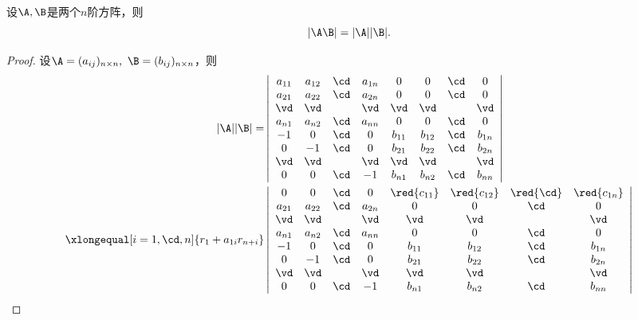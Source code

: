 \begin{dingli}
  设$\A,\B$是两个$n$阶方阵，则
  $$
  |\A\B| = |\A||\B|.
  $$
\end{dingli}
\begin{proof}

  设$\A=(a_{ij})_{n\times n}, ~\B=(b_{ij})_{n\times n}$，则
  $$
  \begin{aligned}
    |\A||\B| =& \left|
      \begin{array}{cccccccc}
        a_{11} & a_{12} & \cd &  a_{1n} & 0 & 0 & \cd & 0\\
        a_{21} & a_{22} & \cd &  a_{2n} & 0 & 0 & \cd & 0\\
        \vd   & \vd   &     & \vd    & \vd & \vd & & \vd\\
        a_{n1} & a_{n2} & \cd &  a_{nn} & 0 & 0 & \cd & 0\\
        -1    & 0     & \cd &   0    & b_{11} & b_{12} & \cd & b_{1n} \\
        0 & -1 & \cd & 0& b_{21} & b_{22} & \cd & b_{2n} \\
        \vd&\vd & & \vd &  \vd  &\vd &  & \vd   \\
        0 & 0 & \cd & -1 & b_{n1} & b_{n2} &\cd     & b_{nn}
      \end{array}
    \right|\\
    \xlongequal[i=1,\cd,n]{r_1+a_{1i}r_{n+i}}&
    \left|
      \begin{array}{cccccccc}
        0     & 0     & \cd &  0     & \red{c_{11}} & \red{c_{12}} & \red{\cd} & \red{c_{1n}}\\
        a_{21} & a_{22} & \cd &  a_{2n} & 0 & 0 & \cd & 0\\
        \vd   & \vd   &     & \vd    & \vd & \vd & & \vd\\
        a_{n1} & a_{n2} & \cd &  a_{nn} & 0 & 0 & \cd & 0\\
        -1    & 0     & \cd &   0    & b_{11} & b_{12} & \cd & b_{1n} \\
        0 & -1 & \cd & 0& b_{21} & b_{22} & \cd & b_{2n} \\
        \vd&\vd & & \vd &  \vd  &\vd &  & \vd   \\
        0 & 0 & \cd & -1 & b_{n1} & b_{n2} &\cd     & b_{nn}
      \end{array}
    \right|
  \end{aligned}
  $$
  
  

  
  

\end{proof}
